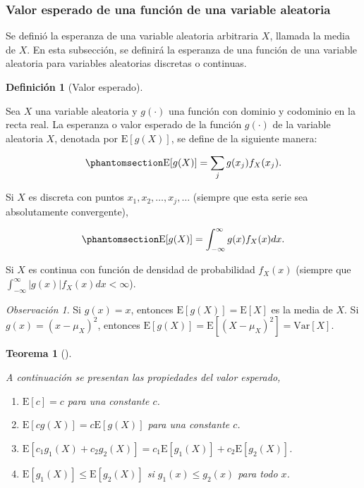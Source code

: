 \documentclass[
  us-letterpaper,
]{scrreprt}
\theoremstyle{plain}
\newtheorem{theorem}{Teorema}[chapter]
\theoremstyle{definition}
\newtheorem{definition}{Definición}[chapter]
\theoremstyle{definition}
\theoremstyle{plain}
\theoremstyle{remark}
\newtheorem*{remark}{Observación}
\begin{document}
\subsubsection{Valor esperado de una función de una variable
aleatoria}\label{valor-esperado-de-una-funciuxf3n-de-una-variable-aleatoria}

Se definió la esperanza de una variable aleatoria arbitraria \(X\),
llamada la media de \(X\). En esta subsección, se definirá la esperanza
de una función de una variable aleatoria para variables aleatorias
discretas o continuas.

\begin{definition}[Valor
esperado]\protect\hypertarget{def-VE}{}\label{def-VE}

Sea \(X\) una variable aleatoria y \(g(\cdot)\) una función con dominio
y codominio en la recta real. La esperanza o valor esperado de la
función \(g(\cdot)\) de la variable aleatoria \(X\), denotada por
\(\mathrm E[g(X)]\), se define de la siguiente manera:

\begin{equation}\phantomsection\label{eq-VE1}{ \mathrm E[g(X)]=\sum_j g(x_j)f_X(x_j). }\end{equation}

Si \(X\) es discreta con puntos \(x_1, x_2, \ldots, x_j, \ldots\)
(siempre que esta serie sea absolutamente convergente),

\begin{equation}\phantomsection\label{eq-VE2}{ \mathrm E[g(X)]=\int_{-\infty}^\infty g(x)f_X(x)dx.}\end{equation}

Si \(X\) es continua con función de densidad de probabilidad \(f_X(x)\)
(siempre que \(\int_{-\infty}^\infty |g(x)|f_X(x)dx < \infty\)).

\end{definition}

\begin{remark}
Si \(g(x)=x\), entonces \(\mathrm E[g(X)]=\mathrm E[X]\) es la media de
\(X\). Si \(g(x)=(x-\mu_X)^2\), entonces
\(\mathrm E[g(X)]=\mathrm E[(X-\mu_X)^2]=\mathrm{Var}[X]\).
\end{remark}

\begin{theorem}[]\protect\hypertarget{thm-propve}{}\label{thm-propve}

A continuación se presentan las propiedades del valor esperado,

\begin{enumerate}
\def\labelenumi{\roman{enumi}.}
\item
  \(\mathrm E[c]=c\) para una constante \(c\).
\item
  \(\mathrm E[cg(X)]=c\mathrm E[g(X)]\) para una constante \(c\).
\item
  \(\mathrm E[c_1 g_1(X)+c_2 g_2(X)]=c_1\mathrm E[g_1(X)]+c_2\mathrm E[g_2(X)]\).
\item
  \(\mathrm E[g_1(X)]\leq \mathrm E[g_2(X)]\) si \(g_1(x)\leq g_2(x)\)
  para todo \(x\).
\end{enumerate}

\end{theorem}
\end{document}
